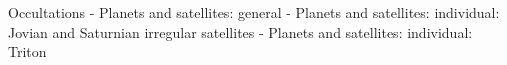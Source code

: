 \documentclass[useAMS,usenatbib]{mn2e}
\begin{document}
\begin{keywords}
Occultations - Planets and satellites: general - Planets and satellites: individual: Jovian and Saturnian irregular satellites - Planets and satellites: individual: Triton
\end{keywords}

%
%
%
%
%
\end{document}
